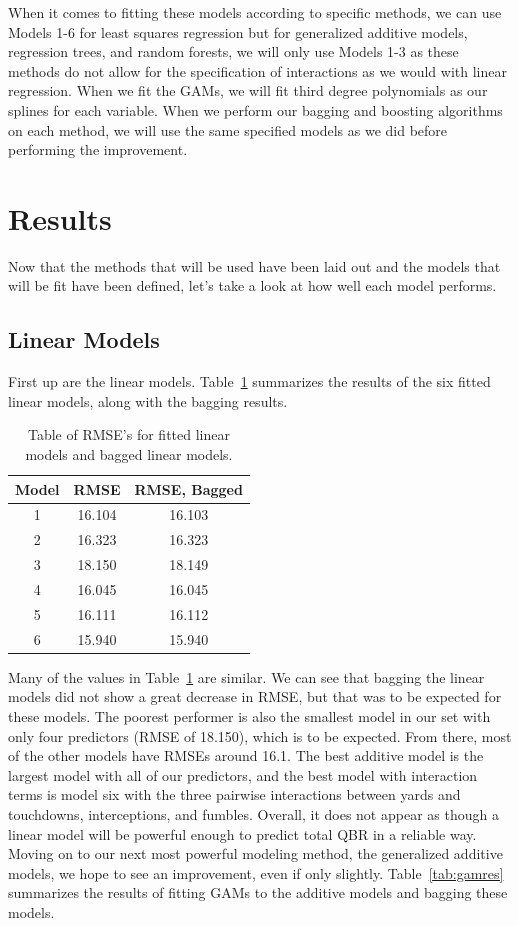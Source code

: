 \documentclass[12pt]{article}\usepackage[]{graphicx}\usepackage[]{color}
\begin{document}
When it comes to fitting these models according to specific methods, we can use Models 1-6 for least squares regression but for generalized additive models, regression trees, and random forests, we will only use Models 1-3 as these methods do not allow for the specification of interactions as we would with linear regression. When we fit the GAMs, we will fit third degree polynomials as our splines for each variable. When we perform our bagging and boosting algorithms on each method, we will use the same specified models as we did before performing the improvement.

\section{Results}
Now that the methods that will be used have been laid out and the models that will be fit have been defined, let's take a look at how well each model performs.

\subsection{Linear Models}
First up are the linear models. Table~\ref{tab:lmres} summarizes the results of the six fitted linear models, along with the bagging results.

\begin{table}[h]
\centering
\begin{tabular}{|c|c|c|}
\hline
Model & RMSE & RMSE, Bagged \\
\hline
1 & 16.104 & 16.103 \\
\hline
2 & 16.323 & 16.323 \\
\hline
3 & 18.150 & 18.149 \\
\hline
4 & 16.045 & 16.045 \\
\hline
5 & 16.111 & 16.112 \\
\hline
6 & 15.940 & 15.940 \\
\hline
\end{tabular}
\captionsetup{font=footnotesize,labelfont=footnotesize}
\caption{\label{tab:lmres} Table of RMSE's for fitted linear models and bagged linear models.}
\end{table}

Many of the values in Table~\ref{tab:lmres} are similar. We can see that bagging the linear models did not show a great decrease in RMSE, but that was to be expected for these models. The poorest performer is also the smallest model in our set with only four predictors (RMSE of 18.150), which is to be expected. From there, most of the other models have RMSEs around 16.1. The best additive model is the largest model with all of our predictors, and the best model with interaction terms is model six with the three pairwise interactions between yards and touchdowns, interceptions, and fumbles. Overall, it does not appear as though a linear model will be powerful enough to predict total QBR in a reliable way. Moving on to our next most powerful modeling method, the generalized additive models, we hope to see an improvement, even if only slightly. Table~\ref{tab:gamres} summarizes the results of fitting GAMs to the additive models and bagging these models.
\end{document}
